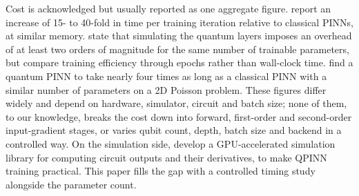 Cost is acknowledged but usually reported as one aggregate figure. \citet{farea2025} report an increase of 15- to
40-fold in time per training iteration relative to classical PINNs, at similar memory. \citet{leong2025} state that
simulating the quantum layers imposes an overhead of at least two orders of magnitude for the same number of
trainable parameters, but compare training efficiency through epochs rather than wall-clock time. \citet{trahan2024}
find a quantum PINN to take nearly four times as long as a classical PINN with a similar number of parameters on a
2D Poisson problem.
These figures differ widely and depend on hardware, simulator, circuit and batch size; none of them, to our
knowledge, breaks the cost down into forward, first-order and second-order input-gradient stages, or varies qubit
count, depth, batch size and backend in a controlled way. On the simulation side, \citet{chen2025} develop a
GPU-accelerated simulation library for computing circuit outputs and their derivatives, to make QPINN training
practical. This paper fills the gap with a controlled timing study alongside the parameter count.
